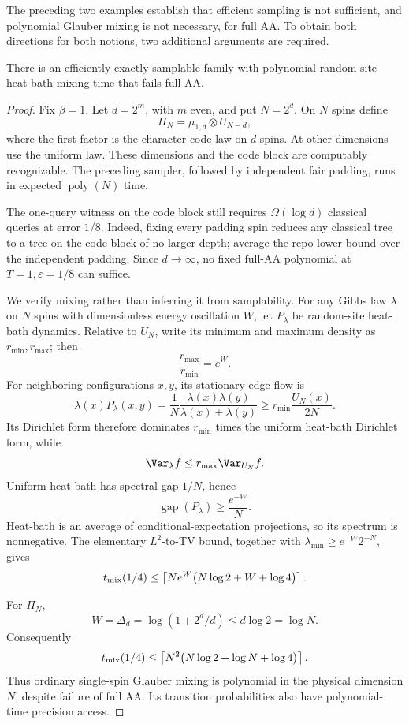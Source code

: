 The preceding two examples establish that efficient sampling is not
sufficient, and polynomial Glauber mixing is not necessary, for full
AA. To obtain both directions for both notions, two additional
arguments are required.

\begin{proposition}
\label{ian:hard-sector-padded-fast-mixing}
There is an efficiently exactly samplable family with polynomial
random-site heat-bath mixing time that fails full AA.
\end{proposition}

\begin{proof}
Fix \(\beta=1\). Let \(d=2^m\), with \(m\) even, and put \(N=2^d\).
On \(N\) spins define
\[
 \Pi_N=\mu_{1,d}\otimes U_{N-d},
\]
where the first factor is the character-code law on \(d\) spins.
At other dimensions use the uniform law. These dimensions and the
code block are computably recognizable. The preceding sampler,
followed by independent fair padding, runs in expected
\(\operatorname{poly}(N)\) time.

The one-query witness on the code block still requires
\(\Omega(\log d)\) classical queries at error \(1/8\).
Indeed, fixing every padding spin reduces any classical tree to a
tree on the code block of no larger depth; average the repo lower
bound over the independent padding. Since \(d\to\infty\), no fixed
full-AA polynomial at \(T=1,\varepsilon=1/8\) can suffice.

We verify mixing rather than inferring it from samplability.
For any Gibbs law \(\lambda\) on \(N\) spins with dimensionless
energy oscillation \(W\), let \(P_\lambda\) be random-site heat-bath
dynamics. Relative to \(U_N\), write its minimum and maximum density
as \(r_{\min},r_{\max}\); then
\[
 \frac{r_{\max}}{r_{\min}}=e^W.
\]
For neighboring configurations \(x,y\), its stationary edge flow is
\[
 \lambda(x)P_\lambda(x,y)
 =\frac1N\frac{\lambda(x)\lambda(y)}{\lambda(x)+\lambda(y)}
 \ge r_{\min}\frac{U_N(x)}{2N}.
\]
Its Dirichlet form therefore dominates \(r_{\min}\) times the uniform
heat-bath Dirichlet form, while
\[
 \Var_\lambda f\le r_{\max}\Var_{U_N}f.
\]
Uniform heat-bath has spectral gap \(1/N\), hence
\[
 \operatorname{gap}(P_\lambda)\ge\frac{e^{-W}}N.
\]
Heat-bath is an average of conditional-expectation projections, so
its spectrum is nonnegative. The elementary \(L^2\)-to-TV bound,
together with \(\lambda_{\min}\ge e^{-W}2^{-N}\), gives
\[
 t_{\rm mix}(1/4)
 \le\left\lceil
 Ne^W\bigl(N\log2+W+\log4\bigr)\right\rceil.
\]

For \(\Pi_N\),
\[
 W=\Delta_d=\log(1+2^d/d)\le d\log2=\log N.
\]
Consequently
\[
 t_{\rm mix}(1/4)
 \le\left\lceil
 N^2\bigl(N\log2+\log N+\log4\bigr)\right\rceil.
\]
Thus ordinary single-spin Glauber mixing is polynomial in the
physical dimension \(N\), despite failure of full AA. Its transition
probabilities also have polynomial-time precision access.
\end{proof}

